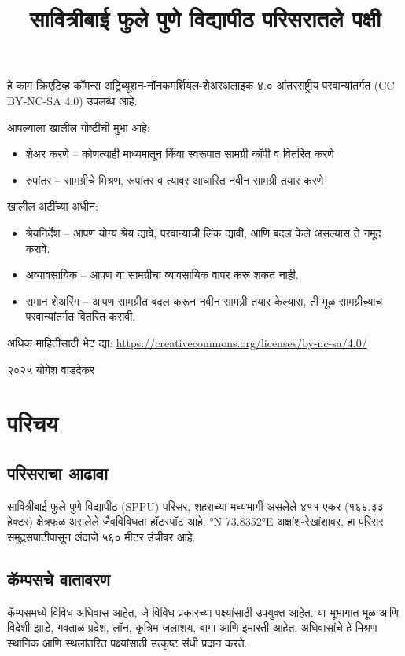 \documentclass[a4paper,12pt,landscape]{memoir}
\title{सावित्रीबाई फुले पुणे विद्यापीठ परिसरातले पक्षी}
\author{}
\date{}
\newcommand{\introsection}[2]{%
  \begin{minipage}[t]{0.48\textwidth}
    \begin{mdframed}[
      linecolor=headingcolor,
      linewidth=1pt,
      roundcorner=5pt,
      leftmargin=0pt,
      rightmargin=0pt,
      backgroundcolor=headingcolor!5
    ]
      #1
    \end{mdframed}
  \end{minipage}\hfill
  \begin{minipage}[t]{0.48\textwidth}
    \begin{mdframed}[
      linecolor=headingcolor,
      linewidth=1pt,
      roundcorner=5pt,
      leftmargin=0pt,
      rightmargin=0pt,
      backgroundcolor=headingcolor!5
    ]
      #2
    \end{mdframed}
  \end{minipage}
  \newpage
}
\begin{document}
\maketitle

\begin{center}
\vspace{1cm}
{\large हे काम क्रिएटिव्ह कॉमन्स अट्रिब्यूशन-नॉनकमर्शियल-शेअरअलाइक ४.० आंतरराष्ट्रीय परवान्यांतर्गत ({\latintext CC BY-NC-SA 4.0}) उपलब्ध आहे.}

\vspace{0.5cm}
{\normalsize आपल्याला खालील गोष्टींची मुभा आहे:
\begin{itemize}
\item शेअर करणे -- कोणत्याही माध्यमातून किंवा स्वरूपात सामग्री कॉपी व वितरित करणे
\item रुपांतर -- सामग्रीचे मिश्रण, रूपांतर व त्यावर आधारित नवीन सामग्री तयार करणे
\end{itemize}

खालील अटींच्या अधीन:
\begin{itemize}
\item श्रेयनिर्देश -- आपण योग्य श्रेय द्यावे, परवान्याची लिंक द्यावी, आणि बदल केले असल्यास ते नमूद करावे.
\item अव्यावसायिक -- आपण या सामग्रीचा व्यावसायिक वापर करू शकत नाही.
\item समान शेअरिंग -- आपण सामग्रीत बदल करून नवीन सामग्री तयार केल्यास, ती मूळ सामग्रीच्याच परवान्यांतर्गत वितरित करावी.
\end{itemize}
}

\vspace{0.5cm}
{\small अधिक माहितीसाठी भेट द्या: 
{\latintext \href{https://creativecommons.org/licenses/by-nc-sa/4.0/}{https://creativecommons.org/licenses/by-nc-sa/4.0/}}}

\vspace{1cm}

{\large{\latintext \textcopyright} २०२५ योगेश वाडदेकर}
\end{center}


\chapter*{परिचय}

\introsection{%
  \section*{\textbf{परिसराचा आढावा}}
  सावित्रीबाई फुले पुणे विद्यापीठ ({\latintext SPPU}) परिसर, शहराच्या मध्यभागी असलेले ४११ एकर (१६६.३३ हेक्टर) क्षेत्रफळ असलेले 
  जैवविविधता हॉटस्पॉट आहे. {\latintext 18.5529°N 73.8352°E} अक्षांश-रेखांशावर, हा परिसर समुद्रसपाटीपासून अंदाजे ५६० मीटर उंचीवर आहे.
}{%
  \section*{कॅम्पसचे वातावरण}
  कॅम्पसमध्ये विविध अधिवास आहेत, जे विविध प्रकारच्या पक्ष्यांसाठी उपयुक्त आहेत. या भूभागात मूळ आणि विदेशी झाडे, गवताळ प्रदेश, लॉन, कृत्रिम जलाशय,
   बागा आणि इमारती आहेत. अधिवासांचे हे मिश्रण स्थानिक आणि स्थलांतरित पक्ष्यांसाठी उत्कृष्ट संधी प्रदान करते.
}
\end{document}
